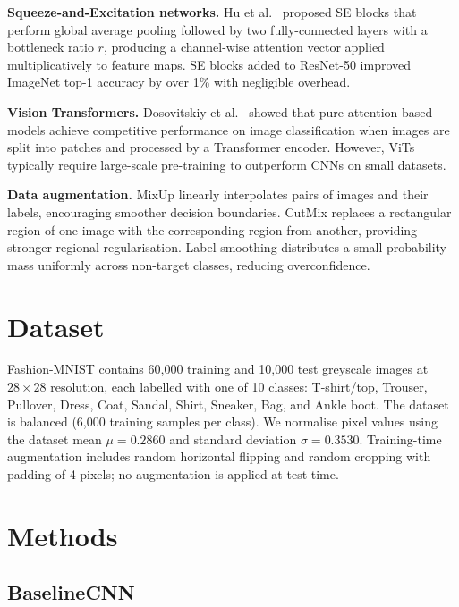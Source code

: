 \documentclass[10pt,a4paper]{article}
\begin{document}
\textbf{Squeeze-and-Excitation networks.}
Hu et al.\ \cite{senet} proposed SE blocks that perform global average pooling followed by two fully-connected layers with a bottleneck ratio $r$, producing a channel-wise attention vector applied multiplicatively to feature maps.
SE blocks added to ResNet-50 improved ImageNet top-1 accuracy by over 1\% with negligible overhead.

\textbf{Vision Transformers.}
Dosovitskiy et al.\ \cite{vit} showed that pure attention-based models achieve competitive performance on image classification when images are split into patches and processed by a Transformer encoder.
However, ViTs typically require large-scale pre-training to outperform CNNs on small datasets.

\textbf{Data augmentation.}
MixUp \cite{mixup} linearly interpolates pairs of images and their labels, encouraging smoother decision boundaries.
CutMix \cite{cutmix} replaces a rectangular region of one image with the corresponding region from another, providing stronger regional regularisation.
Label smoothing \cite{labelsmoothing} distributes a small probability mass uniformly across non-target classes, reducing overconfidence.

\section{Dataset}

Fashion-MNIST \cite{fashionmnist} contains 60{,}000 training and 10{,}000 test greyscale images at $28\!\times\!28$ resolution, each labelled with one of 10 classes: T-shirt/top, Trouser, Pullover, Dress, Coat, Sandal, Shirt, Sneaker, Bag, and Ankle boot.
The dataset is balanced (6{,}000 training samples per class).
We normalise pixel values using the dataset mean $\mu = 0.2860$ and standard deviation $\sigma = 0.3530$.
Training-time augmentation includes random horizontal flipping and random cropping with padding of 4 pixels; no augmentation is applied at test time.

\section{Methods}

\subsection{BaselineCNN}
\end{document}
